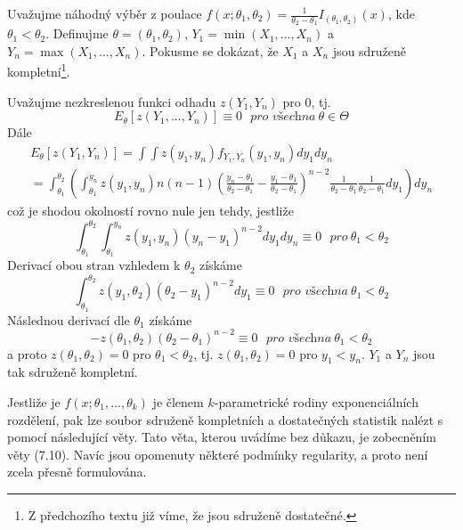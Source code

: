 \begin{example}
Uvažujme náhodný výběr z poulace $f(x; \theta_1, \theta_2) = \frac{1}{\theta_2 - \theta_1}I_{(\theta_1, \theta_2)}(x)$, kde $\theta_1 < \theta_2$. Definujme $\theta = (\theta_1, \theta_2)$, $Y_1 = \min(X_1, ..., X_n)$ a $Y_n = \max(X_1, ..., X_n)$. Pokusme se dokázat, že $X_1$ a $X_n$ jsou sdruženě kompletní\footnote{Z předchozího textu již víme, že jsou sdruženě dostatečné.}.

Uvažujme nezkreslenou funkci odhadu $\mathit{z}(Y_1, Y_n)$ pro 0, tj.
\begin{equation*}
E_{\theta}[\mathit{z}(Y_1, ..., Y_n)] \equiv 0 ~~~ \textit{pro všechna}~\theta \in \Theta
\end{equation*}
Dále
\begin{gather*}
E_{\theta}[\mathit{z}(Y_1, Y_n)] = \int \int \mathit{z}(y_1, y_n)f_{Y_1, Y_n}(y_1, y_n)d y_1 d y_n\\
= \int_{\theta_1}^{\theta_2}\left(\int_{\theta_1}^{y_n}\mathit{z}(y_1, y_n) n(n - 1)\left(\frac{y_n - \theta_1}{\theta_2 - \theta_1} - \frac{y_1 - \theta_1}{\theta_2 - \theta_1}\right)^{n - 2} \frac{1}{\theta_2 - \theta_1}\frac{1}{\theta_2 - \theta_1}dy_1\right)dy_n
\end{gather*}
což je shodou okolností rovno nule jen tehdy, jestliže
\begin{equation*}
\int_{\theta_1}^{\theta_2} \int_{\theta_1}^{y_n} \mathit{z}(y_1, y_n)(y_n - y_1)^{n - 2}dy_1 dy_n \equiv 0 ~~~ \textit{pro}~\theta_1 < \theta_2
\end{equation*}
Derivací obou stran vzhledem k $\theta_2$ získáme
\begin{equation*}
\int_{\theta_1}^{\theta_2} \mathit{z}(y_1, \theta_2)(\theta_2 - y_1)^{n - 2}dy_1 \equiv 0 ~~~ \textit{pro všechna}~\theta_1 < \theta_2
\end{equation*}
Následnou derivací dle $\theta_1$ získáme
\begin{equation*}
-\mathit{z}(\theta_1, \theta_2)(\theta_2 - \theta_1)^{n-2} \equiv 0 ~~~\textit{pro všechna}~\theta_1 < \theta_2
\end{equation*}
a proto $\mathit{z}(\theta_1, \theta_2) = 0$ pro $\theta_1 < \theta_2$, tj. $\mathit{z}(\theta_1, \theta_2) = 0$ pro $y_1 < y_n$. $Y_1$ a $Y_n$ jsou tak sdruženě kompletní.
\end{example}

Jestliže je $f(x; \theta_1, ..., \theta_k)$ je členem $k$-parametrické rodiny exponenciálních rozdělení, pak lze soubor sdruženě kompletních a dostatečných statistik nalézt s pomocí následující věty. Tato věta, kterou uvádíme bez důkazu, je zobecněním věty (7.10). Navíc jsou opomenuty některé podmínky regularity, a proto není zcela přesně formulována.

